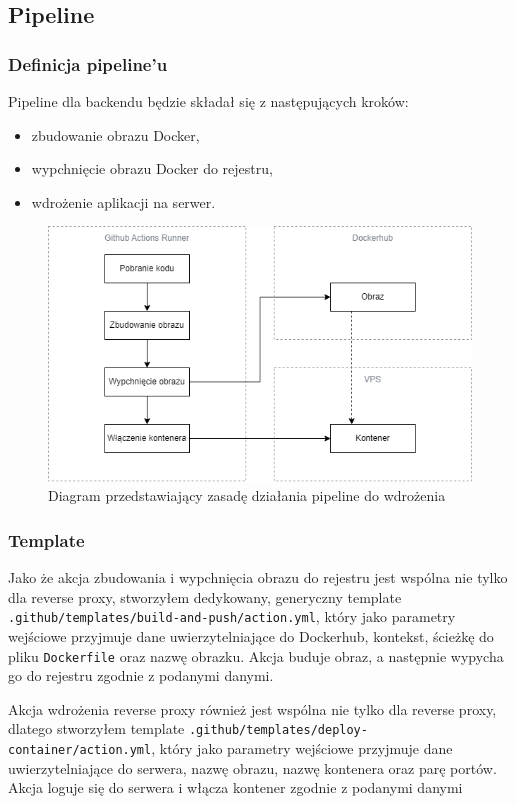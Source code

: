 \documentclass{article}
\begin{document}
\subsection{Pipeline}

\subsubsection{Definicja pipeline'u}

Pipeline dla backendu będzie składał się z następujących kroków:

\begin{itemize}
    \item zbudowanie obrazu Docker,
    \item wypchnięcie obrazu Docker do rejestru,
    \item wdrożenie aplikacji na serwer.
\end{itemize}

\begin{figure}[H]
    \centering
    \includegraphics[width=0.75\linewidth]{githubActionsSchema.png}
    \caption{Diagram przedstawiający zasadę działania pipeline do wdrożenia}
    \label{fig:enter-label}
\end{figure}

\subsubsection{Template}

Jako że akcja zbudowania i wypchnięcia obrazu do rejestru jest wspólna nie tylko dla reverse proxy, stworzyłem dedykowany, generyczny template \lstinline|.github/templates/build-and-push/action.yml|, który jako parametry wejściowe przyjmuje dane uwierzytelniające do Dockerhub, kontekst, ścieżkę do pliku \lstinline|Dockerfile| oraz nazwę obrazku. Akcja buduje obraz, a następnie wypycha go do rejestru zgodnie z podanymi danymi.


Akcja wdrożenia reverse proxy również jest wspólna nie tylko dla reverse proxy, dlatego stworzyłem template \lstinline|.github/templates/deploy-container/action.yml|, który jako parametry wejściowe przyjmuje dane uwierzytelniające do serwera, nazwę obrazu, nazwę kontenera oraz parę portów. Akcja loguje się do serwera i włącza kontener zgodnie z podanymi danymi
\end{document}

